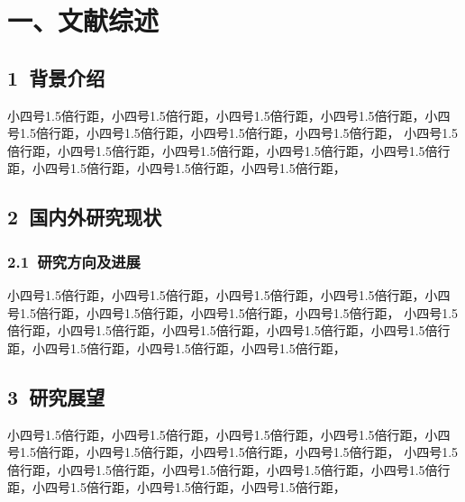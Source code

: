 \section{一、文献综述}
\begin{spacing}{1.5}
         \fangsong \raggedright 
        \setlength{\parindent}{2em}
\subsection{1~背景介绍}         
小四号1.5倍行距，小四号1.5倍行距，小四号1.5倍行距，小四号1.5倍行距，小四号1.5倍行距，小四号1.5倍行距，小四号1.5倍行距，小四号1.5倍行距，
小四号1.5倍行距，小四号1.5倍行距，小四号1.5倍行距，小四号1.5倍行距，小四号1.5倍行距，小四号1.5倍行距，小四号1.5倍行距，小四号1.5倍行距， 
\subsection{2~国内外研究现状}
        \subsubsection{2.1~研究方向及进展}
        小四号1.5倍行距，小四号1.5倍行距，小四号1.5倍行距，小四号1.5倍行距，小四号1.5倍行距，小四号1.5倍行距，小四号1.5倍行距，小四号1.5倍行距，
    小四号1.5倍行距，小四号1.5倍行距，小四号1.5倍行距，小四号1.5倍行距，小四号1.5倍行距，小四号1.5倍行距，小四号1.5倍行距，小四号1.5倍行距， 
\subsection{3~研究展望}

小四号1.5倍行距，小四号1.5倍行距，小四号1.5倍行距，小四号1.5倍行距，小四号1.5倍行距，小四号1.5倍行距，小四号1.5倍行距，小四号1.5倍行距，
小四号1.5倍行距，小四号1.5倍行距，小四号1.5倍行距，小四号1.5倍行距，小四号1.5倍行距，小四号1.5倍行距，小四号1.5倍行距，小四号1.5倍行距， 
\end{spacing}

